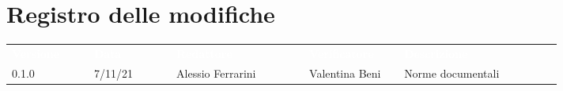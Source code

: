 \section*{Registro delle modifiche}

{\renewcommand{\arraystretch}{1.5}
\begin{tabular}{p{0.13\linewidth}p{0.13\linewidth}p{0.21\linewidth}p{0.15\linewidth}p{0.25\linewidth}}
	\rowcolor[RGB]{33, 73, 50}
	\textcolor{white}{\textbf{Versione}} & \textcolor{white}{\textbf{Data}} & \textcolor{white}
	{\textbf{Redattore}} & \textcolor{white}{\textbf{Verificatore}} & \textcolor{white}
	{\textbf{Descrizione}}\\
	\rowcolor[RGB]{216, 235, 171}
	0.1.0 & 7/11/21 & Alessio Ferrarini & Valentina Beni & Norme documentali\\
	
\end{tabular}	
}